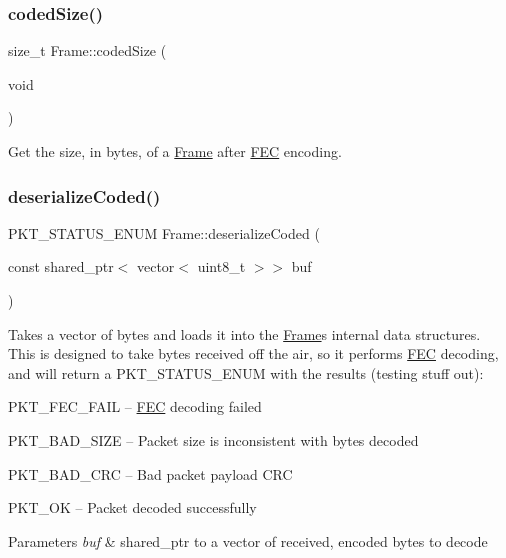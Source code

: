 \subsubsection{\texorpdfstring{coded\+Size()}{codedSize()}}
{\footnotesize\ttfamily size\+\_\+t Frame\+::coded\+Size (\begin{DoxyParamCaption}\item[{void}]{ }\end{DoxyParamCaption})}

Get the size, in bytes, of a \hyperlink{classFrame}{Frame} after \hyperlink{classFEC}{F\+EC} encoding. \mbox{\label{classFrame_a448b698fd4cc568e610f87f971354dc6}} 
\subsubsection{\texorpdfstring{deserialize\+Coded()}{deserializeCoded()}}
{\footnotesize\ttfamily P\+K\+T\+\_\+\+S\+T\+A\+T\+U\+S\+\_\+\+E\+N\+UM Frame\+::deserialize\+Coded (\begin{DoxyParamCaption}\item[{const shared\+\_\+ptr$<$ vector$<$ uint8\+\_\+t $>$$>$}]{buf }\end{DoxyParamCaption})}

Takes a vector of bytes and loads it into the \hyperlink{classFrame}{Frame}\textquotesingle{}s internal data structures. This is designed to take bytes received off the air, so it performs \hyperlink{classFEC}{F\+EC} decoding, and will return a P\+K\+T\+\_\+\+S\+T\+A\+T\+U\+S\+\_\+\+E\+N\+UM with the results (testing stuff out)\+: ~\newline

\begin{DoxyItemize}
\item P\+K\+T\+\_\+\+F\+E\+C\+\_\+\+F\+A\+IL -- \hyperlink{classFEC}{F\+EC} decoding failed ~\newline

\item P\+K\+T\+\_\+\+B\+A\+D\+\_\+\+S\+I\+ZE -- Packet size is inconsistent with bytes decoded ~\newline

\item P\+K\+T\+\_\+\+B\+A\+D\+\_\+\+C\+RC -- Bad packet payload C\+RC ~\newline

\item P\+K\+T\+\_\+\+OK -- Packet decoded successfully ~\newline
 
\begin{DoxyParams}{Parameters}
{\em buf} & shared\+\_\+ptr to a vector of received, encoded bytes to decode \\
\hline
\end{DoxyParams}

\end{DoxyItemize}\mbox{\label{classFrame_ab6513ed996012cf14141615c1ed47e38}} 
